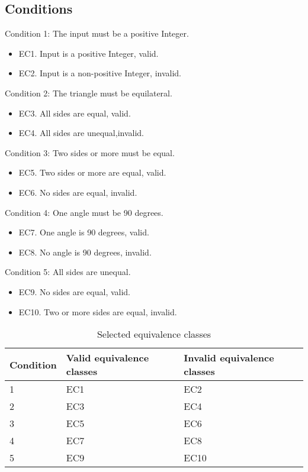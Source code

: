 \subsection{Conditions}
Condition 1: The input must be a positive Integer.
\begin{itemize}
	\item EC1. Input is a positive Integer, valid.
	\item EC2. Input is a non-positive Integer, invalid.
\end{itemize}

Condition 2: The triangle must be equilateral.
\begin{itemize}
	\item EC3. All sides are equal, valid. 
	\item EC4. All sides are unequal,invalid. 
\end{itemize}

Condition 3: Two sides or more must be equal.  
\begin{itemize}
	\item EC5. Two sides or more are equal, valid. 
	\item EC6. No sides are equal, invalid. 
\end{itemize}

Condition 4: One angle must be 90 degrees. 
\begin{itemize}
	\item EC7. One angle is 90 degrees, valid. 
	\item EC8. No angle is 90 degrees, invalid. 
\end{itemize}

Condition 5: All sides are unequal. 
\begin{itemize}
	\item EC9. No sides are equal, valid. 
	\item EC10. Two or more sides are equal, invalid. 
\end{itemize}


\begin{table}
	\centering
	\label{classestable}
	\caption{Selected equivalence classes}
    \begin{tabular}{|l|l|l|}
        \hline
        Condition  & Valid equivalence classes & Invalid equivalence classes \\ \hline
        1          & EC1                       & EC2                         \\ 
        2          & EC3                       & EC4                         \\ 
        3          & EC5                       & EC6                         \\ 
        4          & EC7                       & EC8                         \\ 
        5          & EC9                       & EC10                        \\
        \hline
    \end{tabular}
\end{table}

